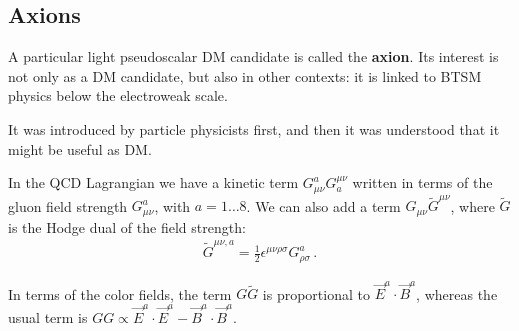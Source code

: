 \documentclass[main.tex]{subfiles}
\begin{document}
\subsection{Axions}







A particular light pseudoscalar DM candidate is called the \textbf{axion}. 
Its interest is not only as a DM candidate, but also in other contexts: it is linked to BTSM physics below the electroweak scale.

It was introduced by particle physicists first, and then it was understood that it might be useful as DM.


In the QCD Lagrangian we have a kinetic term \(G_{\mu \nu }^{a} G^{\mu \nu }_{a}\) written in terms of the gluon field strength \(G_{\mu \nu }^{a}\), with \(a = 1 \dots 8\).
We can also add a term \(G_{\mu \nu } \widetilde{G}^{\mu \nu }\), where \(\widetilde{G}\) is the Hodge dual of the field strength: 
%
\begin{align}
\widetilde{G}^{\mu \nu , a} = \frac{1}{2} \epsilon^{\mu \nu \rho \sigma }G_{\rho \sigma }^{a}
\,.
\end{align}

In terms of the color fields, the term \(G \widetilde{G}\) is proportional to \(\vec{E}^{a} \cdot \vec{B}^{a}\), whereas the usual term is \(GG \propto \vec{E}^{a} \cdot \vec{E}^{a} - \vec{B}^{a} \cdot \vec{B}^{a}\).
\end{document}
